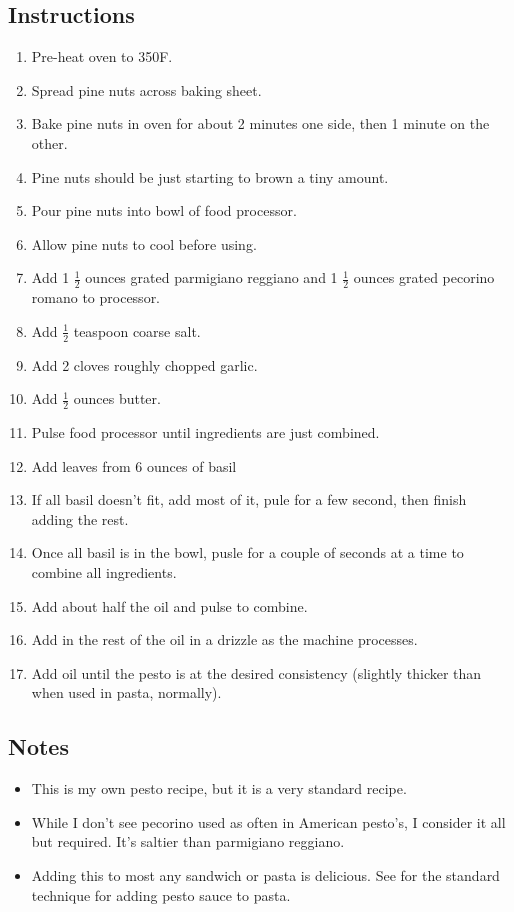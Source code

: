\begin{multicols}{2}
\subsection*{Instructions}
\begin{enumerate}
    \item Pre-heat oven to 350F.
    \item Spread pine nuts across baking sheet.
    \item Bake pine nuts in oven for about 2 minutes one side, then 1 minute on the other.
    \item Pine nuts should be just starting to brown a tiny amount.
    \item Pour pine nuts into bowl of food processor.
    \item Allow pine nuts to cool before using.
    \item Add 1 \( \frac{1}{2} \) ounces grated parmigiano reggiano and 1 \( \frac{1}{2} \) ounces grated pecorino romano to processor.
    \item Add \( \frac{1}{2} \) teaspoon coarse salt.
    \item Add 2 cloves roughly chopped garlic.
    \item Add \( \frac{1}{2} \) ounces butter.
    \item Pulse food processor until ingredients are just combined.
    \item Add leaves from 6 ounces of basil
    \item If all basil doesn't fit, add most of it, pule for a few second, then finish adding the rest.
    \item Once all basil is in the bowl, pusle for a couple of seconds at a time to combine all ingredients.
    \item Add about half the oil and pulse to combine.
    \item Add in the rest of the oil in a drizzle as the machine processes.
    \item Add oil until the pesto is at the desired consistency (slightly thicker than when used in pasta, normally).
\end{enumerate}

\subsection*{Notes}
\begin{itemize}
    \item This is my own pesto recipe, but it is a very standard recipe.
    \item While I don't see pecorino used as often in American pesto's, I consider it all but required. It's saltier than parmigiano reggiano.
    \item Adding this to most any sandwich or pasta is delicious. See  for the standard technique for adding pesto sauce to pasta.
\end{itemize}
\end{multicols}
\clearpage